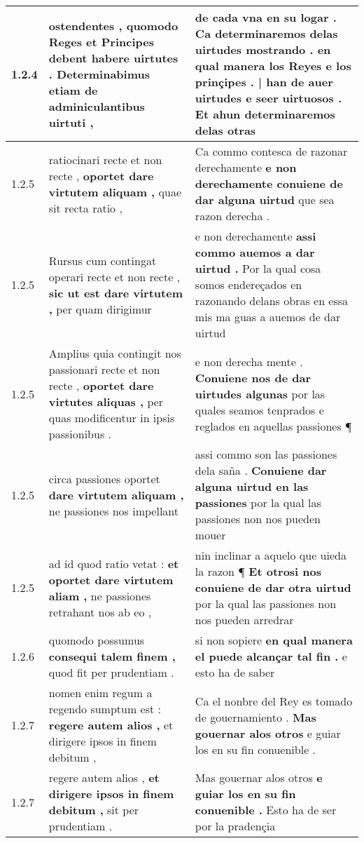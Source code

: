 \begin{tabular}{|p{1cm}|p{6.5cm}|p{6.5cm}|}
1.2.4 & ostendentes , \textbf{ quomodo Reges et Principes debent habere uirtutes . } Determinabimus etiam de adminiculantibus uirtuti , & de cada vna en su logar . Ca determinaremos delas uirtudes mostrando . \textbf{ en qual manera los Reyes e los prinçipes . | han de auer uirtudes e seer uirtuosos . } Et ahun determinaremos delas otras \\\hline
1.2.5 & ratiocinari recte et non recte , \textbf{ oportet dare virtutem aliquam , } quae sit recta ratio , & Ca commo contesca de razonar derechamente \textbf{ e non derechamente conuiene de dar alguna uirtud } que sea razon derecha . \\\hline
1.2.5 & Rursus cum contingat operari recte et non recte , \textbf{ sic ut est dare virtutem , } per quam dirigimur & e non derechamente \textbf{ assi commo auemos a dar uirtud . } Por la qual cosa somos endereçados en razonando delans obras en essa mis ma guas a auemos de dar uirtud \\\hline
1.2.5 & Amplius quia contingit nos passionari recte et non recte , \textbf{ oportet dare virtutes aliquas , } per quas modificentur in ipsis passionibus . & e non derecha mente . \textbf{ Conuiene nos de dar uirtudes algunas } por las quales seamos tenprados e reglados en aquellas passiones ¶ \\\hline
1.2.5 & circa passiones oportet \textbf{ dare virtutem aliquam , } ne passiones nos impellant & assi commo son las passiones dela saña . \textbf{ Conuiene dar alguna uirtud en las passiones } por la qual las passiones non nos pueden mouer \\\hline
1.2.5 & ad id quod ratio vetat : \textbf{ et oportet dare virtutem aliam , } ne passiones retrahant nos ab eo , & nin inclinar a aquelo que uieda la razon ¶ \textbf{ Et otrosi nos conuiene de dar otra uirtud } por la qual las passiones non nos pueden arredrar \\\hline
1.2.6 & quomodo possumus \textbf{ consequi talem finem , } quod fit per prudentiam . & si non sopiere \textbf{ en qual manera el puede alcançar tal fin . } e esto ha de saber \\\hline
1.2.7 & nomen enim regum a regendo sumptum est : \textbf{ regere autem alios , } et dirigere ipsos in finem debitum , & Ca el nonbre del Rey es tomado de gouernamiento . \textbf{ Mas gouernar alos otros } e guiar los en su fin conuenible . \\\hline
1.2.7 & regere autem alios , \textbf{ et dirigere ipsos in finem debitum , } sit per prudentiam . & Mas gouernar alos otros \textbf{ e guiar los en su fin conuenible . } Esto ha de ser por la pradençia \\\hline

\end{tabular}
